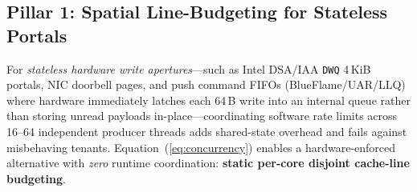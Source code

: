 \subsection{Pillar 1: Spatial Line-Budgeting for Stateless Portals}
\label{sec:design_portal}

For \emph{stateless hardware write apertures}---such as Intel DSA/IAA \texttt{DWQ} 4\,KiB portals, NIC doorbell pages, and push command FIFOs (BlueFlame/UAR/LLQ) where hardware immediately latches each 64\,B write into an internal queue rather than storing unread payloads in-place---coordinating software rate limits across 16--64 independent producer threads adds shared-state overhead and fails against misbehaving tenants. Equation~(\ref{eq:concurrency}) enables a hardware-enforced alternative with \emph{zero} runtime coordination: \textbf{static per-core disjoint cache-line budgeting}.

